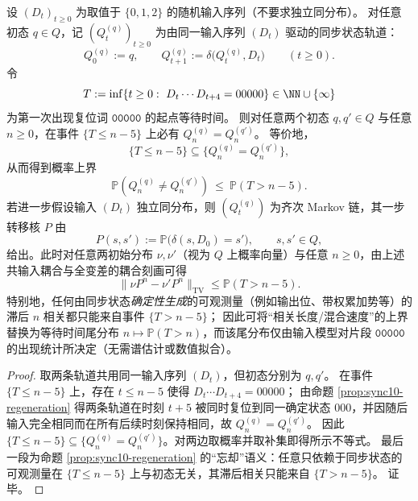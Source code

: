 \begin{corollary}\label{cor:sync10-regeneration-correlation-bound}
设 \((D_t)_{t\ge 0}\) 为取值于 \(\{0,1,2\}\) 的随机输入序列（不要求独立同分布）。
对任意初态 \(q\in Q\)，记 \((Q^{(q)}_t)_{t\ge 0}\) 为由同一输入序列 \((D_t)\) 驱动的同步状态轨道：
\[
Q^{(q)}_0:=q,\qquad Q^{(q)}_{t+1}:=\delta\!\bigl(Q^{(q)}_t,D_t\bigr)\qquad(t\ge 0).
\]
令
\[
T:=\inf\{t\ge 0:\ D_t\cdots D_{t+4}=00000\}\in\NN\cup\{\infty\}
\]
为第一次出现复位词 \(\texttt{00000}\) 的起点等待时间。
则对任意两个初态 \(q,q'\in Q\) 与任意 \(n\ge 0\)，在事件 \(\{T\le n-5\}\) 上必有 \(Q^{(q)}_n=Q^{(q')}_n\)。
等价地，
\[
\{T\le n-5\}\subseteq \{Q^{(q)}_n=Q^{(q')}_n\},
\]
从而得到概率上界
\[
\mathbb{P}\!\left(Q^{(q)}_n\neq Q^{(q')}_n\right)\ \le\ \mathbb{P}(T>n-5).
\]
若进一步假设输入 \((D_t)\) 独立同分布，则 \((Q^{(q)}_t)\) 为齐次 Markov 链，其一步转移核 \(P\) 由
\[
P(s,s'):=\mathbb{P}\bigl(\delta(s,D_0)=s'\bigr),\qquad s,s'\in Q,
\]
给出。此时对任意两初始分布 \(\nu,\nu'\)（视为 \(Q\) 上概率向量）与任意 \(n\ge 0\)，由上述共输入耦合与全变差的耦合刻画可得
\[
\bigl\|\nu P^{n}-\nu'P^{n}\bigr\|_{\mathrm{TV}}\le \mathbb{P}(T>n-5).
\]
特别地，任何由同步状态\emph{确定性生成}的可观测量（例如输出位、带权累加势等）的滞后 \(n\) 相关都只能来自事件 \(\{T>n-5\}\)；
因此可将“相关长度/混合速度”的上界替换为等待时间尾分布 \(n\mapsto \mathbb{P}(T>n)\)，而该尾分布仅由输入模型对片段 \(\texttt{00000}\) 的出现统计所决定（无需谱估计或数值拟合）。
\end{corollary}
\begin{proof}
取两条轨道共用同一输入序列 \((D_t)\)，但初态分别为 \(q,q'\)。
在事件 \(\{T\le n-5\}\) 上，存在 \(t\le n-5\) 使得 \(D_t\cdots D_{t+4}=00000\)；
由命题 \ref{prop:sync10-regeneration} 得两条轨道在时刻 \(t+5\) 被同时复位到同一确定状态 \(000\)，并因随后输入完全相同而在所有后续时刻保持相同，故 \(Q^{(q)}_n=Q^{(q')}_n\)。
因此 \(\{T\le n-5\}\subseteq \{Q^{(q)}_n=Q^{(q')}_n\}\)。对两边取概率并取补集即得所示不等式。
最后一段为命题 \ref{prop:sync10-regeneration} 的“忘却”语义：任意只依赖于同步状态的可观测量在 \(\{T\le n-5\}\) 上与初态无关，其滞后相关只能来自 \(\{T>n-5\}\)。
证毕。
\end{proof}


